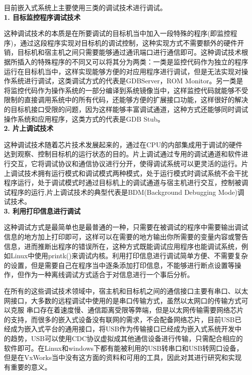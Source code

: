 	目前嵌入式系统上主要使用三类的调试技术进行调试。\\
	\textbf{1. 目标监控程序调试技术}

	这种调试技术的本质是在所要调试的目标机当中加入一段特殊的程序(即监控程序)，通过这段程序实现对目标机的调试控制，这种实现方式不需要额外的硬件开销，目标机和宿主机之间只需要能够通过通讯端口进行通信即可。这种调试技术根据所插入的特殊程序的不同又可以将其分为两类：一类是监控代码作为独立的程序运行在目标机当中，这样实现能够方便的对应用程序进行调试，但是无法实现对操作系统进行调试，这类调试方式的代表是GDBServer，ROM Monitor。另一类是将监控代码作为操作系统的一部分编译到系统镜像当中，这样监控代码就能够不受限制的直接调用系统中的所有代码，还能够方便的扩展接口功能，这样很好的解决的目标机接口受限的问题，因为这样能够丰富调试通道，这种方式还能够同时调试操作系统和应用程序\cite{连丽红2009嵌入式调试技术的研究与实现}，这类方式的代表是GDB Stub。\\	
	\textbf{2. 片上调试技术}
	
	这种调试技术随着芯片技术发展起来的，通过在CPU的内部集成用于调试的硬件达到观察、控制目标机的运行状态的目的。片上调试通过专用的调试通道和软件进行交互，它将调试协议和通信协议进行分开，使得调试系统可以更灵活的运行。片上调试技术拥有运行模式和调试模式两种模式，处于运行模式时调试系统不会干扰程序运行，处于调试模式时通过目标机上的调试通道与宿主机进行交互，控制被调试程序的运行,片上调试技术的典型代表是BDM(Background Debugging Mode)调试技术\cite{连丽红2009嵌入式调试技术的研究与实现}。\\	
	\textbf{3. 利用打印信息进行调试}
	
	这种调试方式是最简单也是最普通的一种，只需要在被调试的程序中需要输出调试信息的地方加上打印即可，这样可以在需要的地方输出你所需要的变量内容或警告信息，进而推断出程序的错误所在，这种方式既能调试应用程序也能调试系统，例如Linux中使用printk()来调试内核。利用打印信息进行调试简单方便、不需要复杂的设置，但是需要自己在程序当中逐条添加打印信息，不能够进行断点设置等操作，但作为一种离线调试方式适合于对信息进行一个事后分析。
			
	
	
	在所有的这些调试技术领域中，宿主机和目标机之间的通信接口主要有串口、以太网接口，大多数的远程调试中使用的是串口传输方式，虽然以太网口的传输方式可以克服 串口存在着速度慢、通信距离受限等弊端，但是以太网传输需要网络芯片的支持，而很多的嵌入式设备没有联网的需求，不会配备网络芯片，目前USB已经成为嵌入式平台的通用接口，将USB作为传输接口已经成为嵌入式系统开发中的趋势，USB可以使用CDC协议虚拟成其他通信设备进行传输，只需配合相应的软件即可。在Linux和windows下都有能被利用的USB转串口和USB转网口设备，但是在VxWorks当中没有这方面的资料和可用的工具，因此对其进行研究和实现有重要的意义。
	
